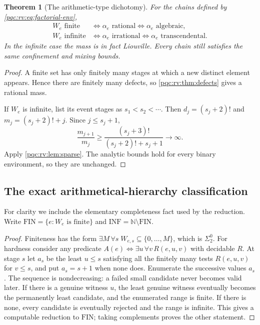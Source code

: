 \documentclass[11pt,letterpaper]{article}
\numberwithin{equation}{section}
\newtheorem{theorem}{Theorem}[section]
\newtheorem{lemma}[theorem]{Lemma}
\theoremstyle{definition}
\theoremstyle{remark}
\newcommand{\N}{\mathbb N}
\begin{document}
\begin{theorem}[The arithmetic-type dichotomy]\label{pqc:rv:thm:dichotomy}
For the chains defined by \cref{pqc:rv:eq:factorial-env},
\begin{align}
 W_e\text{ finite}
 &\Longleftrightarrow\alpha_e\text{ rational}
 \Longleftrightarrow\alpha_e\text{ algebraic},\label{pqc:rv:eq:finite-rat}\\
 W_e\text{ infinite}
 &\Longleftrightarrow\alpha_e\text{ irrational}
 \Longleftrightarrow\alpha_e\text{ transcendental}.
 \label{pqc:rv:eq:infinite-trans}
\end{align}
In the infinite case the mass is in fact Liouville. Every chain still
satisfies the same confinement and mixing bounds.
\end{theorem}
\begin{proof}
A finite set has only finitely many stages at which a new distinct
element appears. Hence there are finitely many defects, so
\cref{pqc:rv:thm:defects} gives a rational mass.

If $W_e$ is infinite, list its event stages as
$s_1<s_2<\cdots$. Then
$d_j=(s_j+2)!$ and $m_j=(s_j+2)!+j$. Since $j\leq s_j+1$,
\[
 \frac{m_{j+1}}{m_j}
 \geq\frac{(s_j+3)!}{(s_j+2)!+s_j+1}
 \longrightarrow\infty.
\]
Apply \cref{pqc:rv:lem:sparse}. The analytic bounds hold for every binary
environment, so they are unchanged.
\end{proof}

\subsection{The exact arithmetical-hierarchy classification}
For clarity we include the elementary completeness fact used by the
reduction. Write
$\mathrm{FIN}=\{e:W_e\text{ is finite}\}$ and
$\mathrm{INF}=\N\setminus\mathrm{FIN}$.

\begin{proof}
Finiteness has the form
$\exists M\,\forall s\; W_{e,s}\subseteq\{0,\ldots,M\}$,
which is $\Sigma^0_2$.
For hardness consider any predicate
$A(e)\Longleftrightarrow\exists u\,\forall v\,R(e,u,v)$
with decidable $R$. At stage $s$ let $a_s$ be the least $u\leq s$
satisfying all the finitely many tests $R(e,u,v)$ for $v\leq s$,
and put $a_s=s+1$ when none does. Enumerate the successive values
$a_s$. The sequence is nondecreasing: a failed small candidate
never becomes valid later. If there is a genuine witness $u$, the
least genuine witness eventually becomes the permanently least
candidate, and the enumerated range is finite. If there is none,
every candidate is eventually rejected and the range is infinite.
This gives a computable reduction to $\mathrm{FIN}$; taking
complements proves the other statement.
\end{proof}
\end{document}
